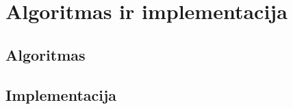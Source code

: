 \documentclass[a4paper,12pt,fleqn,tikz]{article}
\begin{document}
    \newpage
    \section{Algoritmas ir implementacija}
    \label{sec:algorithm_implementation}

    \subsection{Algoritmas}
    \label{sec:algorithm}

    \subsection{Implementacija}
    \label{sec:implementation}



    


\end{document}
